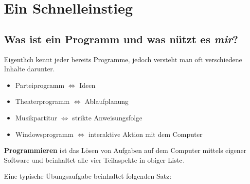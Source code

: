 \chapter{Ein Schnelleinstieg}
\label{p:1}
%
\section{Was ist ein Programm und was nützt es \emph{mir}?}
\label{p:1.1}
%
Eigentlich kennt jeder bereits Programme, jedoch versteht
man oft verschiedene Inhalte darunter.
\begin{itemize}
 \item Parteiprogramm	\hfill $\Longleftrightarrow$ \hfill Ideen
 \item Theaterprogramm	\hfill $\Longleftrightarrow$ \hfill Ablaufplanung
 \item Musikpartitur	\hfill $\Longleftrightarrow$ \hfill strikte Anweisungsfolge
 \item Windowsprogramm	\hfill $\Longleftrightarrow$ \hfill
 			interaktive Aktion mit dem Computer
\end{itemize}
\textbf{Programmieren} ist das Lösen von Aufgaben auf dem Computer
mittels eigener Software und beinhaltet alle vier Teilaspekte in obiger
Liste.

Eine typische Übungsaufgabe beinhaltet folgenden Satz:

\\[1.5ex]

